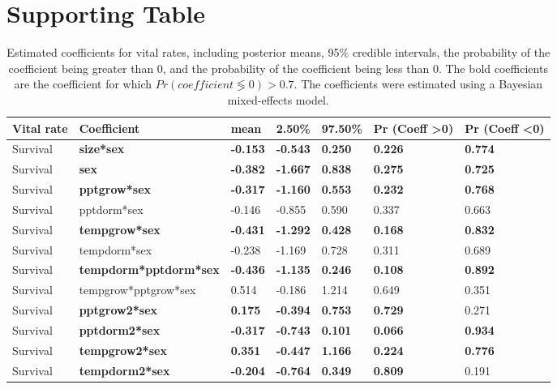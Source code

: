 \documentclass[9pt,twoside,lineno]{pnas-new}
\begin{document}
\section*{Supporting  Table}
\begin{table}[]
\centering
 \caption{Estimated coefficients for vital rates, including posterior means, 95\% credible intervals, the probability of the coefficient being greater than 0, and the probability of the coefficient being less than 0. 
 The bold coefficients are the coefficient for which  $Pr( coefficient  \lessgtr 0) > 0.7$.
 The coefficients were estimated using a Bayesian mixed-effects model.}
\begin{tabular}{lllllll}
\toprule
\textbf{Vital rate} & \textbf{Coefficient} & \textbf{mean} & \textbf{2.50\%} & \textbf{97.50\%} & \textbf{Pr (Coeff \textgreater 0)} & \textbf{Pr (Coeff \textless  0)} \\
\midrule
Survival & \textbf{size*sex} & \textbf{-0.153} & \textbf{-0.543} & \textbf{0.250} & \textbf{0.226} & \textbf{0.774} \\
Survival & \textbf{sex} & \textbf{-0.382} & \textbf{-1.667} & \textbf{0.838} & \textbf{0.275} & \textbf{0.725} \\
Survival & \textbf{pptgrow*sex} & \textbf{-0.317} & \textbf{-1.160} & \textbf{0.553} & \textbf{0.232} & \textbf{0.768} \\
Survival & pptdorm*sex & -0.146 & -0.855 & 0.590 & 0.337 & 0.663 \\
Survival & \textbf{tempgrow*sex} & \textbf{-0.431} & \textbf{-1.292} & \textbf{0.428} & \textbf{0.168} & \textbf{0.832} \\
Survival & tempdorm*sex & -0.238 & -1.169 & 0.728 & 0.311 & 0.689 \\
Survival & \textbf{tempdorm*pptdorm*sex} & \textbf{-0.436} & \textbf{-1.135} & \textbf{0.246} & \textbf{0.108} & \textbf{0.892} \\
Survival & tempgrow*pptgrow*sex & 0.514 & -0.186 & 1.214 & 0.649 & 0.351 \\
Survival & \textbf{pptgrow2*sex} & \textbf{0.175} & \textbf{-0.394} & \textbf{0.753} & \textbf{0.729} & 0.271 \\
Survival & \textbf{pptdorm2*sex} & \textbf{-0.317} & \textbf{-0.743} & \textbf{0.101} & \textbf{0.066} & \textbf{0.934} \\
Survival & \textbf{tempgrow2*sex} & \textbf{0.351} & \textbf{-0.447} & \textbf{1.166} & \textbf{0.224} & \textbf{0.776} \\
Survival & \textbf{tempdorm2*sex} & \textbf{-0.204} & \textbf{-0.764} & \textbf{0.349} & \textbf{0.809} & 0.191 \\

\end{tabular}
\end{table}
\end{document}
